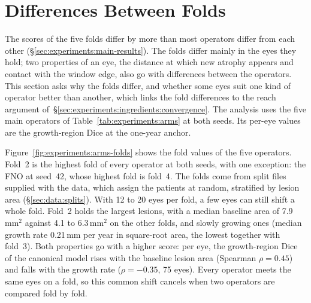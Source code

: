 \section{Differences Between Folds}
\label{sec:experiments:folds}

The scores of the five folds differ by more than most operators differ from
each other (\S\ref{sec:experiments:main-results}). The folds differ mainly
in the eyes they hold; two properties of an eye, the distance at which new
atrophy appears and contact with the window edge, also go with differences
between the operators. This section asks why
the folds differ, and whether some eyes suit one kind of operator better
than another, which links the fold differences to the reach argument
of~\S\ref{sec:experiments:ingredients:convergence}. The analysis uses the
five main operators of Table~\ref{tab:experiments:arms} at both seeds. Its
per-eye values are the growth-region Dice at the one-year anchor.

Figure~\ref{fig:experiments:arms-folds} shows the fold values of the five
operators. Fold~2 is the highest fold of every operator at both seeds, with
one exception: the FNO at seed~42, whose highest fold is fold~4. The folds
come from split files supplied with the data, which assign the patients
at random, stratified by lesion area (\S\ref{sec:data:splits}). With
12 to 20 eyes per fold, a few eyes can still shift a whole fold. Fold~2 holds the
largest lesions, with a median baseline area of 7.9\,mm$^2$ against 4.1 to
6.3\,mm$^2$ on the other folds, and slowly growing ones (median growth rate
0.21\,mm per year in square-root area, the lowest together with fold~3).
Both properties go with a higher score: per eye, the growth-region Dice of
the canonical model rises with the baseline lesion area (Spearman
$\rho = 0.45$) and falls with the growth rate ($\rho = -0.35$, 75 eyes).
Every operator meets the same eyes on a fold, so this common shift cancels
when two operators are compared fold by fold.

